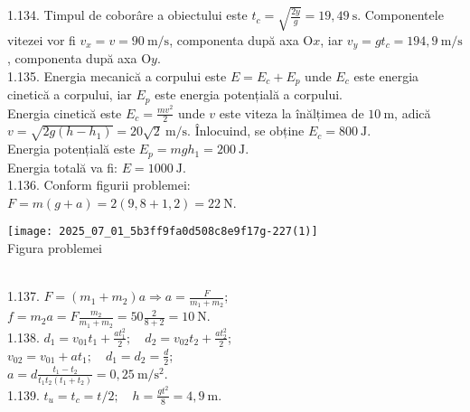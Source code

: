 1.134. Timpul de coborâre a obiectului este $t_{c}=\sqrt{\frac{2 y}{g}}=19,49 \mathrm{~s}$. Componentele vitezei vor fi $v_{x}=v=90 \mathrm{~m} / \mathrm{s}$, componenta după axa $\mathrm{O} x$, iar $v_{y}=g t_{c}=194,9 \mathrm{~m} / \mathrm{s}$, componenta după axa $\mathrm{O} y$.\\

1.135. Energia mecanică a corpului este $E=E_{c}+E_{p}$ unde $E_{c}$ este energia cinetică a corpului, iar $E_{p}$ este energia potențială a corpului.\\ Energia cinetică este $E_{c}=\frac{m v^{2}}{2}$ unde $v$ este viteza la înălțimea de $10 \mathrm{~m}$, adică $v=\sqrt{2 g\left(h-h_{1}\right)}=20 \sqrt{2} \mathrm{~m} / \mathrm{s}$. Înlocuind, se obține $E_{c}=800 \mathrm{~J}$.\\ Energia potențială este $E_{p}=m g h_{1}=200 \mathrm{~J}$.\\ Energia totală va fi: $E=1000 \mathrm{~J}$.\\

1.136. Conform figurii problemei:\\ $F=m(g+a)=2(9,8+1,2)=22 \mathrm{~N}$.\\ \begin{center} \texttt{[image: 2025\_07\_01\_5b3ff9fa0d508c8e9f17g-227(1)]}\\ Figura problemei \end{center}\\

1.137. $F=\left(m_{1}+m_{2}\right) a \Rightarrow a=\frac{F}{m_{1}+m_{2}}$;\\ $f=m_{2} a=F \frac{m_{2}}{m_{1}+m_{2}}=50 \frac{2}{8+2}=10 \mathrm{~N}$.\\

1.138. $d_{1}=v_{01} t_{1}+\frac{a t_{1}^{2}}{2}; \quad d_{2}=v_{02} t_{2}+\frac{a t_{2}^{2}}{2}$;\\ $v_{02}=v_{01}+a t_{1}; \quad d_{1}=d_{2}=\frac{d}{2}$;\\ $a=d \frac{t_{1}-t_{2}}{t_{1} t_{2}\left(t_{1}+t_{2}\right)}=0,25 \mathrm{~m} / \mathrm{s}^{2}$.\\

1.139. $t_{u}=t_{c}=t / 2; \quad h=\frac{g t^{2}}{8}=4,9 \mathrm{~m}$.\\

